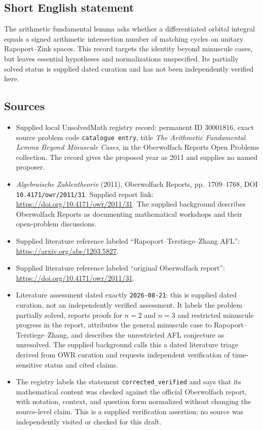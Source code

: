 \documentclass[11pt]{article}
\begin{document}
\subsection{Short English statement}
The arithmetic fundamental lemma asks whether a differentiated orbital integral equals a signed arithmetic intersection number of matching cycles on unitary Rapoport--Zink spaces. This record targets the identity beyond minuscule cases, but leaves essential hypotheses and normalizations unspecified. Its partially solved status is supplied dated curation and has not been independently verified here.
\subsection{Sources}
\begin{itemize}
\item Supplied local UnsolvedMath registry record: permanent ID \(30001816\), exact source problem code \texttt{catalogue entry}, title \emph{The Arithmetic Fundamental Lemma Beyond Minuscule Cases}, in the Oberwolfach Reports Open Problems collection. The record gives the proposed year as 2011 and supplies no named proposer.
\item \emph{Algebraische Zahlentheorie} (2011), Oberwolfach Reports, pp.~1709--1768, DOI \texttt{10.4171/owr/2011/31}. Supplied report link: \url{https://doi.org/10.4171/owr/2011/31}. The supplied background describes Oberwolfach Reports as documenting mathematical workshops and their open-problem discussions.
\item Supplied literature reference labeled ``Rapoport--Terstiege--Zhang AFL'': \url{https://arxiv.org/abs/1203.5827}.
\item Supplied literature reference labeled ``original Oberwolfach report'': \url{https://doi.org/10.4171/owr/2011/31}.
\item Literature assessment dated exactly \texttt{2026-08-21}: this is supplied dated curation, not an independently verified assessment. It labels the problem partially solved, reports proofs for \(n=2\) and \(n=3\) and restricted minuscule progress in the report, attributes the general minuscule case to Rapoport--Terstiege--Zhang, and describes the unrestricted AFL conjecture as unresolved. The supplied background calls this a dated literature triage derived from OWR curation and requests independent verification of time-sensitive status and cited claims.
\item The registry labels the statement \texttt{corrected\_verified} and says that its mathematical content was checked against the official Oberwolfach report, with notation, context, and question form normalized without changing the source-level claim. This is a supplied verification assertion; no source was independently visited or checked for this draft.
\end{itemize}
\end{document}
